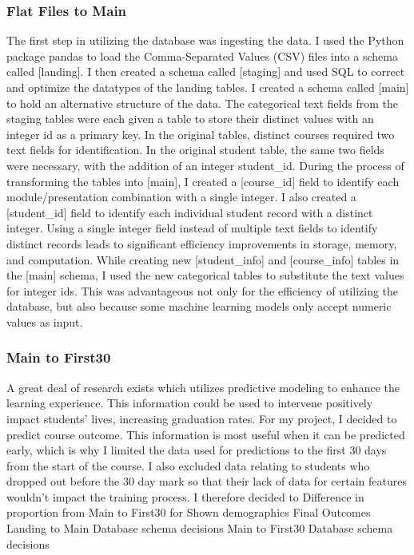 \documentclass{article}
\begin{document}
            \subsubsection{Flat Files to Main}
                The first step in utilizing the database was ingesting the data.
                I used the Python package pandas to load the Comma-Separated Values (CSV) files into a schema called [landing].
                I then created a schema called [staging] and used SQL to correct and optimize the datatypes of the landing tables.       
                I created a schema called [main] to hold an alternative structure of the data.
                \newline
                The categorical text fields from the staging tables were each given a table to store their distinct values with an integer id as a primary key.
                In the original tables, distinct courses required two text fields for identification.
                In the original student table, the same two fields were necessary, with the addition of an integer student\_id. 
                During the process of transforming the tables into [main], I created a [course\_id] field to identify each module/presentation combination with a single integer.
                I also created a [student\_id] field to identify each individual student record with a distinct integer. 
                Using a single integer field instead of multiple text fields to identify distinct records leads to significant efficiency improvements in storage, memory, and computation.
                While creating new [student\_info] and [course\_info] tables in the [main] schema, I used the new categorical tables to substitute the text values for integer ids.
                This was advantageous not only for the efficiency of utilizing the database, but also because some machine learning models only accept numeric values as input.

            \subsubsection{Main to First30}
                A great deal of research exists which utilizes predictive modeling to enhance the learning experience.
                This information could be used to intervene positively impact students' lives, increasing graduation rates.
                For my project, I decided to predict course outcome.
                This information is most useful when it can be predicted early, which is why I limited the data used for predictions to the first 30 days from the start of the course.
                I also excluded data relating to students who dropped out before the 30 day mark so that their lack of data for certain features wouldn't impact the training process.
                \newline
                I therefore decided to 
                Difference in proportion from Main to First30 for 
                Shown demographics
                Final Outcomes
                Landing to Main Database schema decisions
                Main to First30 Database schema decisions
\end{document}
